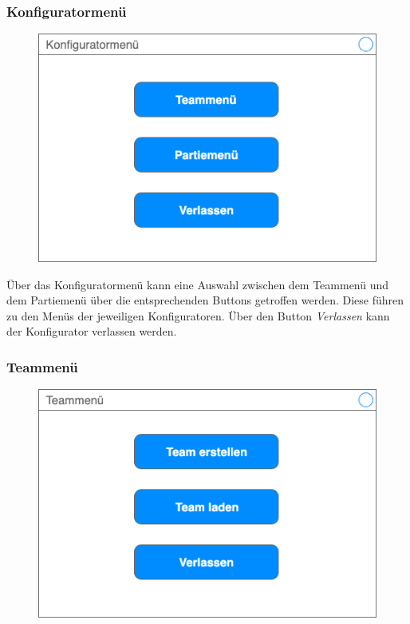\subsubsection{Konfiguratormenü}

    \begin{figure}[H]
        \centering
        \includegraphics[width=\textwidth/2]{../Meilenstein03/images/konfiguratormenue}
    \end{figure}

    Über das Konfiguratormenü kann eine Auswahl zwischen dem Teammenü und dem Partiemenü über die entsprechenden Buttons getroffen werden. Diese führen zu den Menüs der jeweiligen Konfiguratoren. Über den Button \textit{Verlassen} kann der Konfigurator verlassen werden.

    \subsubsection{Teammenü}
    \begin{figure}[H]
        \centering
        \includegraphics[width=\textwidth/2]{../Meilenstein03/images/teammenue}
    \end{figure}

